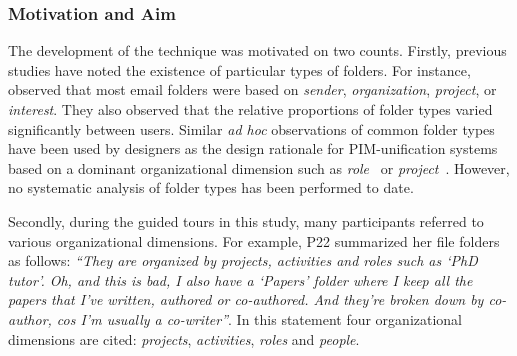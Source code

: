 \subsubsection{Motivation and Aim}
The development of the technique was motivated on two counts.
Firstly, previous studies have noted the existence of particular types of folders. For instance, \citet{Ducheneaut:01} observed that most email folders were based on \textit{sender}, \textit{organization}, \textit{project}, or \textit{interest}.  They also observed that the relative proportions of folder types varied significantly between users.  Similar \textit{ad hoc} observations of common folder types have been used by designers as the design rationale for PIM-unification systems based on a dominant organizational dimension such as \textit{role}~\citep{Shneiderman:94} or \textit{project}~\citep{Kaptelinin:03}.  However, no systematic analysis of folder types has been performed to date.

Secondly, during the guided tours in this study, many participants referred to various organizational dimensions. %
For example, P22 summarized her file folders as follows: \textit{``They are organized by projects, activities and roles such as `PhD tutor'. Oh, and this is bad, I also have a `Papers' folder where I keep all the papers that I've written, authored or co-authored. And they're broken down by co-author, cos I'm usually a co-writer''}.  In this statement four organizational dimensions are cited: \textit{projects}, \textit{activities}, \textit{roles} and \textit{people}. %


